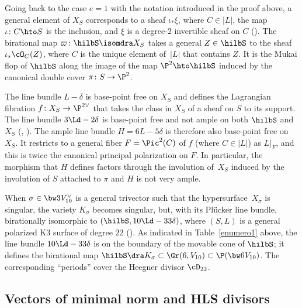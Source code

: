 \begin{rema}\upshape\label{rema33}
Going back to the case $e=1$ with the notation introduced in the proof above, a
general element of $X_S$
corresponds to a sheaf $\iota_{*}\xi$, where $C\in |L|$, the map $\iota\colon C\hto S$ is the inclusion, and $\xi$ is a degree-$2$ invertible sheaf on $C$ (\cite[Ex.\,0.6]{muk0}).
The birational map $
\varpi\colon
\hilbS\isomdra X_S$ takes a general $Z\in \hilbS$ to the sheaf $\iota_{*}\cO_C(Z)$, where $C$ is the unique element of~$|L|$ that contains $Z$. It is
the Mukai flop of $\hilbS $ along the image of the map $\P^2\hto \hilbS$ induced by the canonical double cover $\pi\colon S\to \P^2$.

The line bundle $L-\delta$ is base-point free on $X_S$ and defines the Lagrangian fibration \mbox{$f\colon X_S\to \P^{2\vee}$} that takes the class in $X_S$ of a sheaf on $S$ to its support.
The line bundle $3\Ld-2\delta$ is base-point free and not ample on both $\hilbS$ and $X_S$
(\cite[Exer.\,3.13]{survey}, \cite[Lem.\,2.1.12]{vdd}). The ample line bundle $H=6L-5\delta$ is therefore also base-point free on $X_S$. It restricts to a general fiber $F=\Pic^2(C)$ of $f$ (where $C\in |L|$) as $L\vert_F$, and this is twice the canonical principal polarization on $F$. In particular, the morphism that $H$ defines factors through the involution of~$X_S$ induced by the involution of $S$ attached to $\pi$ and $H$ is not very ample.
\end{rema}

\begin{rema}\label{rema36}
When $\sigma\in \bw3V_{10}^\vee$ is a general trivector such that the hypersurface~$X_\sigma$ is singular, the variety $K_\sigma$ becomes singular, but, with its Plücker line bundle, birationally isomorphic to $(\hilbS, 10\Ld-33\delta)$, where $(S,L)$ is a general polarized K3 surface of degree $22$ (\cite[Prop.\,3.4]{devo}). As indicated in Table~\ref{enumero1} above, the line bundle $10\Ld-33\delta$ is on the boundary of the movable cone of $\hilbS$; it defines the birational map $\hilbS\dra K_\sigma \subset \Gr(6,V_{10})\subset \P(\bw6V_{10})$. The corresponding ``periods'' cover the Heegner divisor $ \cD_{22}$.
\end{rema}

\subsection{Vectors of minimal norm and HLS divisors}\label{section35}

